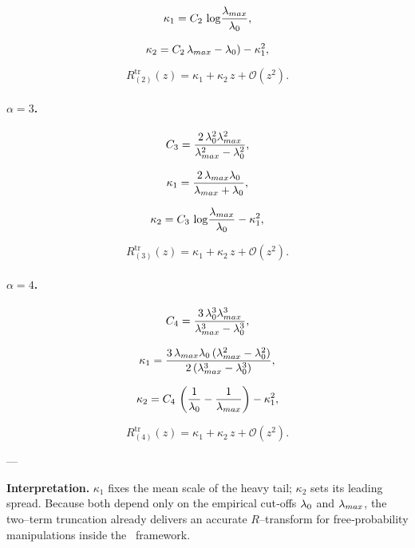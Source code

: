 \begin{equation}
\kappa_{1}=C_{2}\,\log\!\frac{\lambda_{max}}{\lambda_{0}},
\end{equation}

\begin{equation}
\kappa_{2}=C_{2}\,\lambda_{max}-\lambda_{0})-\kappa_{1}^{2},
\end{equation}

\begin{equation}
R_{(2)}^{\mathrm{tr}}(z)=
\kappa_{1}+\kappa_{2}\,z+\mathcal{O}\!\left(z^{2}\right).
\end{equation}


\paragraph{$\alpha = 3$.}

\begin{equation}
C_{3}=\frac{2\,\lambda_{0}^{2}\lambda_{max}^{2}}{\lambda_{max}^{2}-\lambda_{0}^{2}},
\end{equation}

\begin{equation}
\kappa_{1}=\frac{2\,\lambda_{max}\lambda_{0}}{\lambda_{max}+\lambda_{0}},
\end{equation}

\begin{equation}
\kappa_{2}=C_{3}\,\log\!\frac{\lambda_{max}}{\lambda_{0}}
-\kappa_{1}^{2},
\end{equation}

\begin{equation}
R_{(3)}^{\mathrm{tr}}(z)=
\kappa_{1}+\kappa_{2}\,z+\mathcal{O}\!\left(z^{2}\right).
\end{equation}


\paragraph{$\alpha = 4$.}

\begin{equation}
C_{4}=\frac{3\,\lambda_{0}^{3}\lambda_{max}^{3}}{\lambda_{max}^{3}-\lambda_{0}^{3}},
\end{equation}

\begin{equation}
\kappa_{1}=
\frac{3\,\lambda_{max}\lambda_{0}\,(\lambda_{max}^{2}-\lambda_{0}^{2})}
     {2\,(\lambda_{max}^{3}-\lambda_{0}^{3})},
\end{equation}

\begin{equation}
\kappa_{2}=C_{4}\,
\left(\frac{1}{\lambda_{0}}-\frac{1}{\lambda_{max}}\right)
-\kappa_{1}^{2},
\end{equation}

\begin{equation}
R_{(4)}^{\mathrm{tr}}(z)=
\kappa_{1}+\kappa_{2}\,z+\mathcal{O}\!\left(z^{2}\right).
\end{equation}

---

\textbf{Interpretation.}  
$\kappa_{1}$ fixes the mean scale of the heavy tail;
$\kappa_{2}$ sets its leading spread.  
Because both depend only on the empirical cut‑offs
$\lambda_{0}$ and $\lambda_{max}$, the two–term truncation already delivers
an accurate $R$–transform for free‑probability manipulations inside the
\SETOL\ framework.